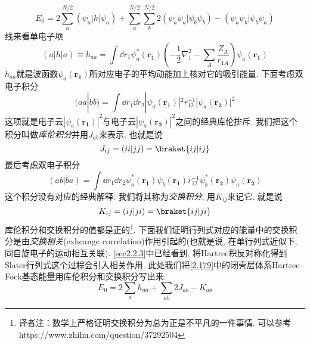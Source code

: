 \begin{equation}
\label{2.179}
E_0 = 2 \sum_{a}^{N/2}(\psi_a|h|\psi_a) + \sum_{a}^{N/2}\sum_{b}^{N/2}2(\psi_a\psi_a|\psi_b\psi_b) - (\psi_a\psi_b|\psi_b\psi_a)
\end{equation}
线来看单电子项
\begin{equation}
(a|h|a) \equiv h_{aa} = \int\dd{r_1}\psi_a^*(\mathbf{r_1})\left( -\frac{1}{2}\nabla_1^2 - \sum_A\frac{Z_A}{r_{1A}} \right)\psi_a(\mathbf{r_1})
\end{equation}
$h_{aa}$就是波函数$\psi_a(\mathbf{r_1})$所对应电子的平均动能加上核对它的吸引能量. 下面考虑双电子积分
\begin{equation}
(aa|bb) = \int\dd{r_1}\dd{r_2}|\psi_a(\mathbf{r_1})|^2r_{12}^{-1}|\psi_a(\mathbf{r_2})|^2
\end{equation}
这项就是电子云$|\psi_a(\mathbf{r_1})|^2$与电子云$|\psi_a(\mathbf{r_2})|^2$之间的经典库伦排斥. 
我们把这个积分叫做\emph{库伦积分}并用$J_{ab}$来表示. 
也就是说
\begin{equation}
J_{ij} = (ii|jj) = \braket{ij|ij}
\end{equation} 
最后考虑双电子积分
\begin{equation}
(ab|ba) = \int\dd{r_1}\dd{r_2} \psi_a^*(\mathbf{r_1})\psi_b(\mathbf{r_1}) r_{12}^{-1} \psi_b^*(\mathbf{r_2}) \psi_a(\mathbf{r_2})
\end{equation}
这个积分没有对应的经典解释. 
我们将其称为\emph{交换积分}, 
用$K_{ij}$来记它. 
就是说
\begin{equation}
K_{ij} = (ij|ji) = \braket{ij|ji}
\end{equation}
库伦积分和交换积分的值都是正的\footnote{译者注：数学上严格证明交换积分为总为正是不平凡的一件事情. 可以参考 https://www.zhihu.com/question/37292504}. 
下面我们证明行列式对应的能量中的交换积分是由\emph{交换相关}(exhcange correlation)作用引起的(也就是说,
在单行列式近似下, 
同自旋电子的运动相互关联). 
\autoref{sec2.2.3}中已经看到, 
将Hartree积反对称化得到Slater行列式这个过程会引入相关作用. 
此处我们将\autoref{2.179}中的闭壳层体系Hartree-Fock基态能量用库伦积分和交换积分写出来:
\begin{equation}
E_0 = 2\sum_a h_{aa} + \sum_{ab}2J_{ab} - K_{ab} 
\end{equation}

